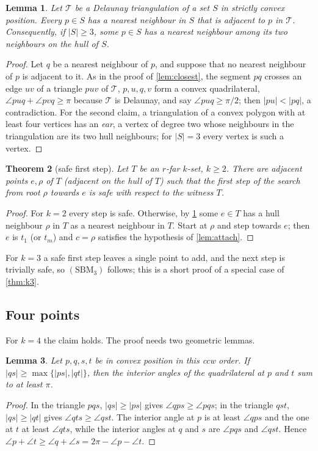 \documentclass[11pt,a4paper]{article}
\newtheorem{theorem}{Theorem}
\newtheorem{lemma}[theorem]{Lemma}
\theoremstyle{definition}
\theoremstyle{remark}
\newcommand{\ang}{\angle}
\begin{document}
\begin{lemma}\label{lem:nnadjacent}
Let $\mathcal T$ be a Delaunay triangulation of a set $S$ in strictly convex
position. Every $p\in S$ has a nearest neighbour in $S$ that is adjacent to $p$
in $\mathcal T$. Consequently, if $|S|\ge3$, some $p\in S$ has a nearest
neighbour among its two neighbours on the hull of $S$.
\end{lemma}
\begin{proof}
Let $q$ be a nearest neighbour of $p$, and suppose that no nearest neighbour
of $p$ is adjacent to it. As in the proof of \cref{lem:closest}, the segment
$pq$ crosses an edge $uv$ of a triangle $puv$ of $\mathcal T$, $p,u,q,v$ form a
convex quadrilateral, $\ang puq+\ang pvq\ge\pi$ because $\mathcal T$ is
Delaunay, and say $\ang puq\ge\pi/2$; then $|pu|<|pq|$, a contradiction. For
the second claim, a triangulation of a convex polygon with at least four
vertices has an \emph{ear}, a vertex of degree two whose neighbours in the
triangulation are its two hull neighbours; for $|S|=3$ every vertex is such a
vertex.
\end{proof}

\begin{theorem}[safe first step]\label{thm:firststep}
Let $T$ be an $r$-far $k$-set, $k\ge2$. There are adjacent points $e,\rho$ of
$T$ (adjacent on the hull of $T$) such that the first step of the search from
root $\rho$ towards $e$ is safe with respect to the witness $T$.
\end{theorem}
\begin{proof}
For $k=2$ every step is safe. Otherwise, by \cref{lem:nnadjacent} some $e\in T$
has a hull neighbour $\rho$ in $T$ as a nearest neighbour in $T$. Start at
$\rho$ and step towards $e$; then $e$ is $t_1$ (or $t_m$) and $c=\rho$
satisfies the hypothesis of \cref{lem:attach}.
\end{proof}

For $k=3$ a safe first step leaves a single point to add, and the next step
is trivially safe, so $(\mathrm{SBM}_3)$ follows; this is a short proof of a
special case of \cref{thm:k3}.

\subsection{Four points}
For $k=4$ the claim holds. The proof needs two geometric lemmas.

\begin{lemma}\label{lem:opposite}
Let $p,q,s,t$ be in convex position in this ccw order. If
$|qs|\ge\max\{|ps|,|qt|\}$, then the interior angles of the quadrilateral at
$p$ and $t$ sum to at least $\pi$.
\end{lemma}
\begin{proof}
In the triangle $pqs$, $|qs|\ge|ps|$ gives $\ang qps\ge\ang pqs$; in the
triangle $qst$, $|qs|\ge|qt|$ gives $\ang qts\ge\ang qst$. The interior angle
at $p$ is at least $\ang qps$ and the one at $t$ at least $\ang qts$, while
the interior angles at $q$ and $s$ are $\ang pqs$ and $\ang qst$. Hence
$\ang p+\ang t\ge\ang q+\ang s=2\pi-\ang p-\ang t$.
\end{proof}
\end{document}
